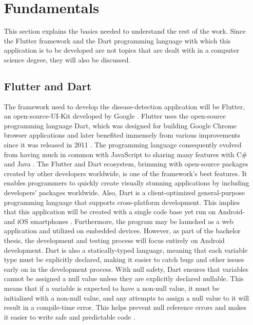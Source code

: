 \chapter{Fundamentals}
This section explains the basics needed to understand the rest of the work. Since the Flutter framework and the Dart programming language with which this application is to be developed are not topics that are dealt with in a computer science degree, they will also be discussed.

\section{Flutter and Dart}
The framework used to develop the disease-detection application will be Flutter, an open-source-UI-Kit developed by Google  \cite{.flutterDEV}. Flutter uses the open-source programming language Dart, which was designed for building Google Chrome browser applications and later benefited immensely from various improvements since it was released in 2011 \cite{whatisdart}. The programming language consequently evolved from having much in common with JavaScript to sharing many features with C\# and Java \cite{.javadart}. The Flutter and Dart ecosystem, brimming with open-source packages created by other developers worldwide, is one of the framework's best features. It enables programmers to quickly create visually stunning applications by including developers' packages worldwide. Also, Dart is a client-optimized general-purpose programming language that supports cross-platform development. This implies that this application will be created with a single code base yet run on Android- and iOS smartphones \cite{.dartoverview}.
Furthermore, the program may be launched as a web application and utilized on embedded devices. However, as part of the bachelor thesis, the development and testing process will focus entirely on Android development. Dart is also a statically-typed language, meaning that each variable type must be explicitly declared, making it easier to catch bugs and other issues early on in the development process. With null safety, Dart ensures that variables cannot be assigned a null value unless they are explicitly declared nullable. This means that if a variable is expected to have a non-null value, it must be initialized with a non-null value, and any attempts to assign a null value to it will result in a compile-time error. This helps prevent null reference errors and makes it easier to write safe and predictable code \cite{.dartoverview}.

